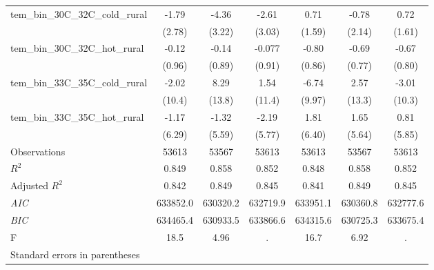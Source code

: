 \documentclass[paper=letterpaper, fontsize=11pt]{article} %
\begin{document}
\begin{longtable}{l*{6}{c}}
tem\_bin\_30C\_32C\_cold\_rural&       -1.79&       -4.36&       -2.61&        0.71&       -0.78&        0.72\\
                    &      (2.78)&      (3.22)&      (3.03)&      (1.59)&      (2.14)&      (1.61)\\
tem\_bin\_30C\_32C\_hot\_rural&       -0.12&       -0.14&      -0.077&       -0.80&       -0.69&       -0.67\\
                    &      (0.96)&      (0.89)&      (0.91)&      (0.86)&      (0.77)&      (0.80)\\
tem\_bin\_33C\_35C\_cold\_rural&       -2.02&        8.29&        1.54&       -6.74&        2.57&       -3.01\\
                    &      (10.4)&      (13.8)&      (11.4)&      (9.97)&      (13.3)&      (10.3)\\
tem\_bin\_33C\_35C\_hot\_rural&       -1.17&       -1.32&       -2.19&        1.81&        1.65&        0.81\\
                    &      (6.29)&      (5.59)&      (5.77)&      (6.40)&      (5.64)&      (5.85)\\
\hline
Observations        &       53613&       53567&       53613&       53613&       53567&       53613\\
\(R^{2}\)           &       0.849&       0.858&       0.852&       0.848&       0.858&       0.852\\
Adjusted \(R^{2}\)  &       0.842&       0.849&       0.845&       0.841&       0.849&       0.845\\
\textit{AIC}        &    633852.0&    630320.2&    632719.9&    633951.1&    630360.8&    632777.6\\
\textit{BIC}        &    634465.4&    630933.5&    633866.6&    634315.6&    630725.3&    633675.4\\
F                   &        18.5&        4.96&           .&        16.7&        6.92&           .\\
\hline\hline
\multicolumn{7}{l}{\footnotesize Standard errors in parentheses}\\
\end{longtable}
\end{document}
